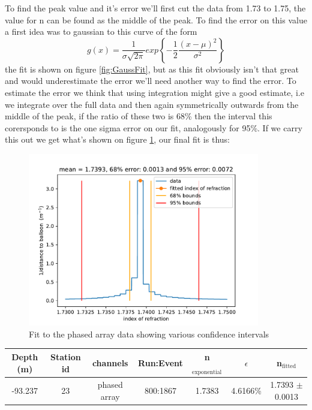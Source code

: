 \documentclass[11pt,a4paper,faculty=we,language=en,doctype=report]{cls/ugent-doc}
\begin{document}
To find the peak value and it's error we'll first cut the data from
1.73 to 1.75, the value for n can be found as the middle of the
peak. To find the error on this value a first idea was to gaussian
to this curve of the
form\cite{grabe2005measurement}
\begin{equation}
	g(x) = \frac{1}{\sigma \sqrt{2\pi}} exp\left\{-\frac{1}{2}\frac{(x-\mu)^2}{\sigma^2}\right\}
\end{equation}
the fit is shown on figure \ref{fig:GaussFit}, but as this fit obviously isn't
that great and would underestimate the error we'll need another way to find the
error.  To estimate the error we think that using integration might give a good
estimate, i.e we integrate over the full data and then again symmetrically
outwards from the middle of the peak, if the ratio of these two is 68\% then
the interval this corersponds to is the one sigma error on our fit, analogously
for 95\%. If we carry this out we get what's shown on figure
\ref{fig:PhasedArrayFit}, our final fit is thus:
\begin{figure}
	\centering
	\includegraphics[width=0.9\textwidth]{PhasedArrayFit.pdf}
	\caption{Fit to the phased array data showing various confidence intervals}
	\label{fig:PhasedArrayFit}
\end{figure}
\begin{center}
\begin{tabular}{||c c c c c c c||}
 \hline
 Depth (m) & Station id & channels & Run:Event & n$_\text{exponential}$ & $\epsilon$ & n$_\text{fitted}$\\ [0.5ex]
 \hline\hline
 -93.237 & 23 & phased array & 800:1867 & 1.7383 & 4.6166\% & 1.7393 $\pm$ 0.0013 \\
 \hline
\end{tabular}
\end{center}
\end{document}
